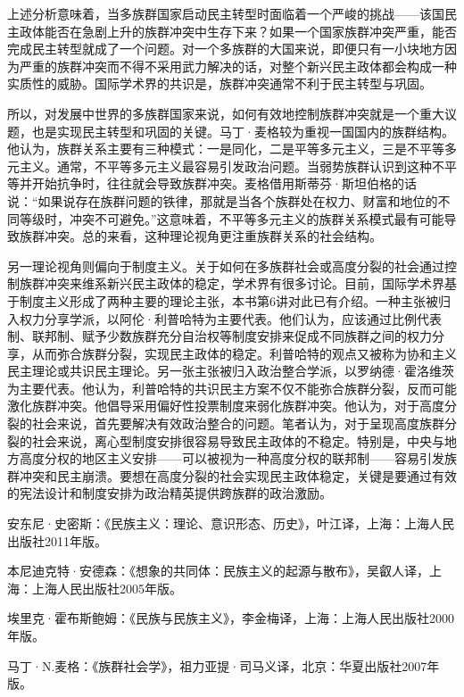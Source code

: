 上述分析意味着，当多族群国家启动民主转型时面临着一个严峻的挑战——该国民主政体能否在急剧上升的族群冲突中生存下来？如果一个国家族群冲突严重，能否完成民主转型就成了一个问题。对一个多族群的大国来说，即便只有一小块地方因为严重的族群冲突而不得不采用武力解决的话，对整个新兴民主政体都会构成一种实质性的威胁。国际学术界的共识是，族群冲突通常不利于民主转型与巩固。

所以，对发展中世界的多族群国家来说，如何有效地控制族群冲突就是一个重大议题，也是实现民主转型和巩固的关键。马丁·麦格较为重视一国国内的族群结构。他认为，族群关系主要有三种模式：一是同化，二是平等多元主义，三是不平等多元主义。通常，不平等多元主义最容易引发政治问题。当弱势族群认识到这种不平等并开始抗争时，往往就会导致族群冲突。麦格借用斯蒂芬·斯坦伯格的话说：“如果说存在族群问题的铁律，那就是当各个族群处在权力、财富和地位的不同等级时，冲突不可避免。”这意味着，不平等多元主义的族群关系模式最有可能导致族群冲突。总的来看，这种理论视角更注重族群关系的社会结构。

另一理论视角则偏向于制度主义。关于如何在多族群社会或高度分裂的社会通过控制族群冲突来维系新兴民主政体的稳定，学术界有很多讨论。目前，国际学术界基于制度主义形成了两种主要的理论主张，本书第6讲对此已有介绍。一种主张被归入权力分享学派，以阿伦·利普哈特为主要代表。他们认为，应该通过比例代表制、联邦制、赋予少数族群充分自治权等制度安排来促成不同族群之间的权力分享，从而弥合族群分裂，实现民主政体的稳定。利普哈特的观点又被称为协和主义民主理论或共识民主理论。另一张主张被归入政治整合学派，以罗纳德·霍洛维茨为主要代表。他认为，利普哈特的共识民主方案不仅不能弥合族群分裂，反而可能激化族群冲突。他倡导采用偏好性投票制度来弱化族群冲突。他认为，对于高度分裂的社会来说，首先要解决有效政治整合的问题。笔者认为，对于呈现高度族群分裂的社会来说，离心型制度安排很容易导致民主政体的不稳定。特别是，中央与地方高度分权的地区主义安排——可以被视为一种高度分权的联邦制——容易引发族群冲突和民主崩溃。要想在高度分裂的社会实现民主政体稳定，关键是要通过有效的宪法设计和制度安排为政治精英提供跨族群的政治激励。


安东尼·史密斯：《民族主义：理论、意识形态、历史》，叶江译，上海：上海人民出版社2011年版。

本尼迪克特·安德森：《想象的共同体：民族主义的起源与散布》，吴叡人译，上海：上海人民出版社2005年版。

埃里克·霍布斯鲍姆：《民族与民族主义》，李金梅译，上海：上海人民出版社2000年版。

马丁·N.麦格：《族群社会学》，祖力亚提·司马义译，北京：华夏出版社2007年版。
